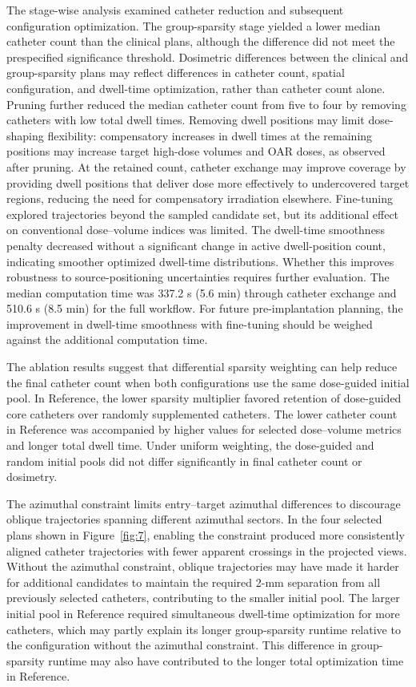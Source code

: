 \documentclass[12pt,twoside,letterpaper]{article}
\begin{document}
The stage-wise analysis examined catheter reduction and subsequent configuration optimization. The group-sparsity stage yielded a lower median catheter count than the clinical plans, although the difference did not meet the prespecified significance threshold. Dosimetric differences between the clinical and group-sparsity plans may reflect differences in catheter count, spatial configuration, and dwell-time optimization, rather than catheter count alone. Pruning further reduced the median catheter count from five to four by removing catheters with low total dwell times. Removing dwell positions may limit dose-shaping flexibility: compensatory increases in dwell times at the remaining positions may increase target high-dose volumes and OAR doses, as observed after pruning. At the retained count, catheter exchange may improve coverage by providing dwell positions that deliver dose more effectively to undercovered target regions, reducing the need for compensatory irradiation elsewhere. Fine-tuning explored trajectories beyond the sampled candidate set, but its additional effect on conventional dose--volume indices was limited. The dwell-time smoothness penalty decreased without a significant change in active dwell-position count, indicating smoother optimized dwell-time distributions. Whether this improves robustness to source-positioning uncertainties requires further evaluation. The median computation time was 337.2 s (5.6 min) through catheter exchange and 510.6 s (8.5 min) for the full workflow. For future pre-implantation planning, the improvement in dwell-time smoothness with fine-tuning should be weighed against the additional computation time.

The ablation results suggest that differential sparsity weighting can help reduce the final catheter count when both configurations use the same dose-guided initial pool. In Reference, the lower sparsity multiplier favored retention of dose-guided core catheters over randomly supplemented catheters. The lower catheter count in Reference was accompanied by higher values for selected dose--volume metrics and longer total dwell time. Under uniform weighting, the dose-guided and random initial pools did not differ significantly in final catheter count or dosimetry.

The azimuthal constraint limits entry--target azimuthal differences to discourage oblique trajectories spanning different azimuthal sectors. In the four selected plans shown in Figure~\ref{fig:7}, enabling the constraint produced more consistently aligned catheter trajectories with fewer apparent crossings in the projected views. Without the azimuthal constraint, oblique trajectories may have made it harder for additional candidates to maintain the required 2-mm separation from all previously selected catheters, contributing to the smaller initial pool. The larger initial pool in Reference required simultaneous dwell-time optimization for more catheters, which may partly explain its longer group-sparsity runtime relative to the configuration without the azimuthal constraint. This difference in group-sparsity runtime may also have contributed to the longer total optimization time in Reference.
\end{document}
